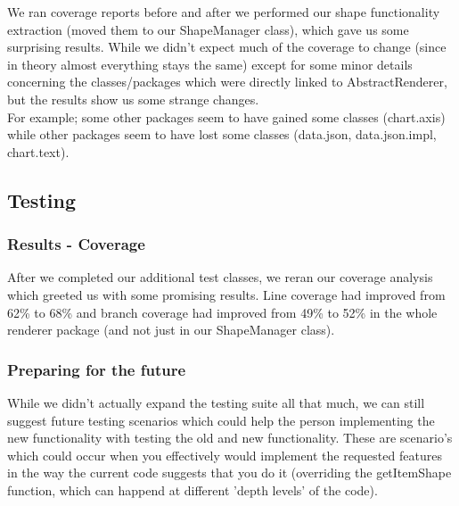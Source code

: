 \documentclass{article}
\begin{document}
We ran coverage reports before and after we performed our shape functionality extraction (moved them to our ShapeManager class), which gave us some surprising results. While we didn't expect much of the coverage to change (since in theory almost everything stays the same) except for some minor details concerning the classes/packages which were directly linked to AbstractRenderer, but the results show us some strange changes.\\

For example; some other packages seem to have gained some classes (chart.axis) while other packages seem to have lost some classes (data.json, data.json.impl, chart.text).

\subsection{Testing}

\subsubsection{Results - Coverage}

After we completed our additional test classes, we reran our coverage analysis which greeted us with some promising results. Line coverage had improved from 62\% to 68\% and branch coverage had improved from 49\% to 52\% in the whole renderer package (and not just in our ShapeManager class).

\subsubsection{Preparing for the future}

While we didn't actually expand the testing suite all that much, we can still suggest future testing scenarios which could help the person implementing the new functionality with testing the old and new functionality. These are scenario's which could occur when you effectively would implement the requested features in the way the current code suggests that you do it (overriding the getItemShape function, which can happend at different 'depth levels' of the code).\\
\end{document}
